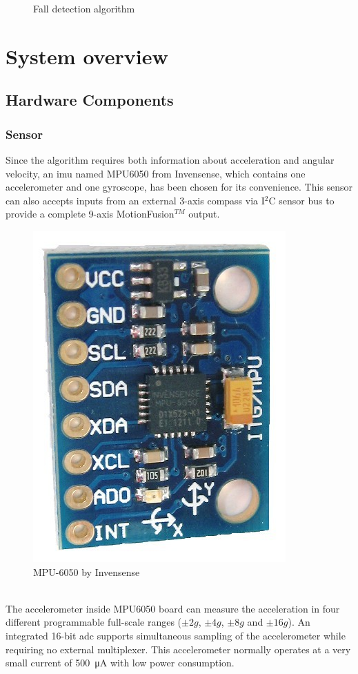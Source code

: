 \documentclass[letterpaper,12pt,titlepage,oneside,final]{book}
\let\origdoublepage\cleardoublepage
\newcommand{\clearemptydoublepage}{%
	\clearpage{\pagestyle{empty}\origdoublepage}}
\let\cleardoublepage\clearemptydoublepage
\begin{document}
\begin{figure}
	\caption{Fall detection algorithm}
\end{figure}
\cleardoublepage

\chapter{System overview}

\section{Hardware Components}

\subsection{Sensor}
Since the algorithm requires both information about acceleration and angular velocity, an \gls{imu} named MPU6050 from Invensense\textregistered, which contains one accelerometer and one gyroscope, has been chosen for its convenience. This sensor can also accepts inputs from an external 3-axis compass via I$^{2}$C sensor bus to provide a complete 9-axis MotionFusion$^{TM}$ output.
 \begin{figure}[h]
	\centering
	\includegraphics[scale=0.25]{mpu6050}
	\caption{MPU-6050 by Invensense \cite{mpu}}
\end{figure}\\
The accelerometer inside MPU6050 board can measure the acceleration in four different programmable full-scale ranges ($\pm2g$, $\pm4g$, $\pm8g$ and $\pm16g$). An integrated 16-bit \gls{adc} supports simultaneous sampling of the accelerometer while requiring no external multiplexer. This accelerometer normally operates at a very small current of \SI{500}{\micro\ampere} with low power consumption. 
\end{document}

